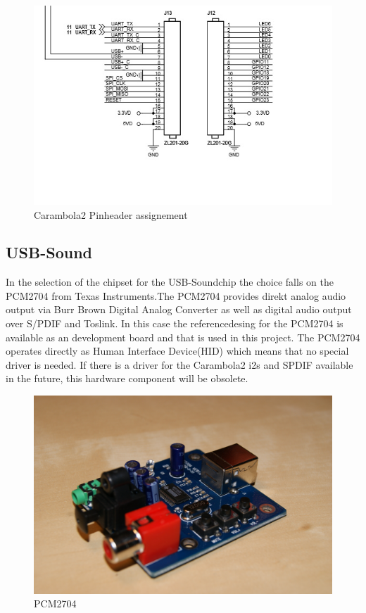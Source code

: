 \begin{figure}[h!]
	\begin{center}
	\includegraphics[scale=0.4]{pictures/carambola2_gpios}
	\caption{Carambola2 Pinheader assignement}
	\end{center}
\end{figure}
\subsection{USB-Sound}
In the selection of the chipset for the USB-Soundchip the choice falls on the PCM2704 from Texas Instruments.The PCM2704 provides direkt analog audio output via Burr Brown Digital Analog Converter as well as digital audio output over S/PDIF and Toslink. In this case the referencedesing for the PCM2704 is available as an development board and that is used in this project. The PCM2704 operates directly as Human Interface Device(HID) which means that no special driver is needed. If there is a driver for the Carambola2 i2s and SPDIF available in the future, this hardware component will be obsolete.

\begin{figure}[h!]
\begin{center}
\includegraphics[scale=0.35]{pictures/pcm2704}
\caption{PCM2704}
\end{center}
\end{figure}
